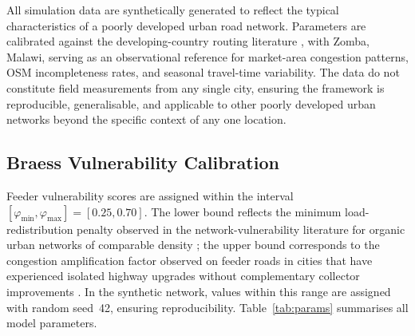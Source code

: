 \documentclass[paper=A4, 12pt, mathscr]{report}
\begin{document}
	All simulation data are synthetically generated to reflect the typical
	characteristics of a poorly developed urban road network. Parameters are
	calibrated against the developing-country routing literature
	\cite{8,9}, with Zomba, Malawi, serving as an observational reference for
	market-area congestion patterns, OSM incompleteness rates, and seasonal
	travel-time variability. The data do not constitute field measurements
	from any single city, ensuring the framework is reproducible,
	generalisable, and applicable to other poorly developed urban networks
	beyond the specific context of any one location.
	
	\subsection*{Braess Vulnerability Calibration}
	\label{sec:braess_calib}
	
	Feeder vulnerability scores are assigned within the interval
	$[\varphi_{\min},\varphi_{\max}]=[0.25,0.70]$. The lower bound reflects
	the minimum load-redistribution penalty observed in the
	network-vulnerability literature for organic urban networks of comparable
	density \cite{11}; the upper bound corresponds to the congestion
	amplification factor observed on feeder roads in cities that have
	experienced isolated highway upgrades without complementary collector
	improvements \cite{gonzalez2023}. In the synthetic network, values within
	this range are assigned with random seed~42, ensuring reproducibility.
	Table~\ref{tab:params} summarises all model parameters.
	
\end{document}
